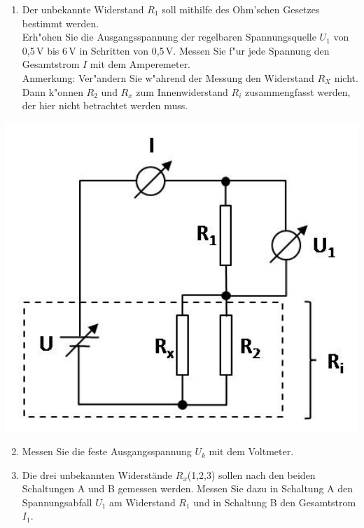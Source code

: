 \begin{minipage}{0.6\textwidth}
 \begin{enumerate}
  \item Der unbekannte Widerstand $R_1$ soll mithilfe des Ohm'schen Gesetzes bestimmt werden.\\
   Erh"ohen Sie die Ausgangsspannung der regelbaren Spannungsquelle $U_1$ von 0,5\,V bis 6\,V in Schritten von 0,5\,V. Messen Sie f"ur jede Spannung den Gesamtstrom $I$ mit dem Amperemeter.\\
   Anmerkung: Ver"andern Sie w"ahrend der Messung den Widerstand $R_X$ nicht. Dann k"onnen $R_2$ und $R_x$ zum Innenwiderstand $R_i$ zusammengfasst werden, der hier nicht betrachtet werden muss.
 \end{enumerate}
\end{minipage}
%
\begin{minipage}{0.35\textwidth}
 \includegraphics[width=1.00\textwidth]{Abbildungen/Schaltung1.jpg}
 \label{fig:Schaltung1}
\end{minipage}

\begin{enumerate} \setcounter{enumi}{1}
 \item Messen Sie die feste Ausgangsspannung $U_k$ mit dem Voltmeter.
 \item Die drei unbekannten Widerstände $R_x$(1,2,3) sollen nach den beiden Schaltungen A und B gemessen werden. Messen Sie dazu in Schaltung A den Spannungsabfall $U_1$ am Widerstand $R_1$ und in Schaltung B den Gesamtstrom $I_1$.
\end{enumerate}


